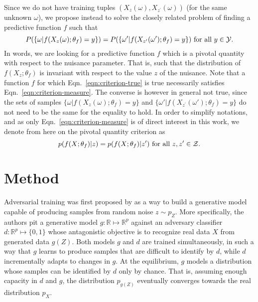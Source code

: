 \documentclass{article}
\theoremstyle{plain}
\begin{document}
Since we do not have training tuples $(X_{z}(\omega),
X_{z^\prime}(\omega))$ (for the same unknown $\omega$), we propose instead to
solve the closely related problem of finding a predictive function $f$ such that
\begin{equation}\label{eqn:criterion-measure}
    P(\{ \omega | f(X_{z}(\omega) ; \theta_f) = y \} ) = P( \{ \omega' | f(X_{z^\prime}(\omega') ; \theta_f) = y\}) \text{ for all $y \in {\cal Y}$}.
\end{equation}
In words, we are looking for a predictive function $f$ which is a pivotal
quantity \citep{degroot1986probability} with respect to the nuisance parameter.
That is, such that  the distribution of $f(X_z; \theta_f)$ is invariant
with respect to the value $z$ of the nuisance. Note that a function $f$ for which
Eqn.~\ref{eqn:criterion-true} is true necessarily satisfies
Eqn.~\ref{eqn:criterion-measure}. The converse is however in general not true, since the
sets of samples $\{ \omega | f(X_{z}(\omega); \theta_f) = y \}$ and $\{
\omega' | f(X_{z^\prime}(\omega'); \theta_f) = y \}$ do not need to be the same
for the equality to hold.
In order to simplify notations,
and as only Eqn.~\ref{eqn:criterion-measure} is
of direct interest in this work, we denote from here on
the pivotal quantity criterion as
\begin{equation}\label{eqn:criterion}
    p(f(X ; \theta_f) | z ) = p(f(X ; \theta_f) | z^\prime ) \text{ for all $z,z^\prime \in  {\cal Z}$.}
\end{equation}



\section{Method}
\label{sec:method}

Adversarial training was first proposed by \cite{goodfellow2014generative} as a
way to build a generative model capable of producing samples from random noise
$z \sim p_Z$. More specifically, the authors pit a generative model $g: \mathbb{R}
\mapsto \mathbb{R}^p$ against an adversary classifier $d : \mathbb{R}^p \mapsto \{
0, 1\}$ whose antagonistic objective is to recognize real data $X$ from generated data $g(Z)$. Both
models $g$ and $d$ are trained simultaneously, in such a way that $g$ learns to
produce samples that are difficult to identify by $d$, while $d$ incrementally
adapts to changes in $g$. At the equilibrium, $g$ models a distribution whose
samples can be identified by $d$ only by chance. That is, assuming enough
capacity in $d$ and  $g$, the distribution $p_{g(Z)}$ eventually converges
towards the real distribution $p_X$.
\end{document}
